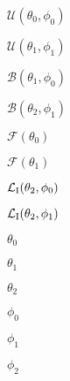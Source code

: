 $\mathcal{U}(\theta_0,\phi_0)$

$\mathcal{U}(\theta_1,\phi_1)$

$\mathcal{B}(\theta_1,\phi_0)$

$\mathcal{B}(\theta_2,\phi_1)$

$\mathcal{F}(\theta_0)$

$\mathcal{F}(\theta_1)$

$\mathcal{L}_{\rm I}(\theta_2,\phi_0)$

$\mathcal{L}_{\rm I}(\theta_2,\phi_1)$

$\theta_0$

$\theta_1$

$\theta_2$

$\phi_0$

$\phi_1$

$\phi_2$

